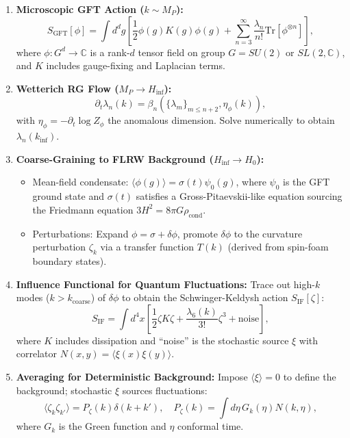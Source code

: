 \documentclass[12pt,a4paper]{article}
\begin{document}
\begin{enumerate}
\item \textbf{Microscopic GFT Action (\(k \sim M_P\)):}
\begin{equation}
S_{\text{GFT}}[\phi] = \int d^d g \left[ \frac{1}{2} \phi(g) K(g) \phi(g) + \sum_{n=3}^\infty \frac{\lambda_n}{n!} \text{Tr}[\phi^{\otimes n}] \right],
\end{equation}
where \(\phi: G^d \to \mathbb{C}\) is a rank-\(d\) tensor field on group \(G = SU(2)\) or \(SL(2, \mathbb{C})\), and \(K\) includes gauge-fixing and Laplacian terms.

\item \textbf{Wetterich RG Flow (\(M_P \to H_{\text{inf}}\)):}
\begin{equation}
\partial_t \lambda_n(k) = \beta_n(\{\lambda_m\}_{m \leq n+2}, \eta_\phi(k)),
\end{equation}
with \(\eta_\phi = -\partial_t \log Z_\phi\) the anomalous dimension. Solve numerically to obtain \(\lambda_n(k_{\text{inf}})\).

\item \textbf{Coarse-Graining to FLRW Background (\(H_{\text{inf}} \to H_0\)):}
\begin{itemize}
\item Mean-field condensate: \(\langle \phi(g) \rangle = \sigma(t) \psi_0(g)\), where \(\psi_0\) is the GFT ground state and \(\sigma(t)\) satisfies a Gross-Pitaevskii-like equation sourcing the Friedmann equation \(3H^2 = 8\pi G \rho_{\text{cond}}\).
\item Perturbations: Expand \(\phi = \sigma + \delta\phi\), promote \(\delta\phi\) to the curvature perturbation \(\zeta_k\) via a transfer function \(T(k)\) (derived from spin-foam boundary states).
\end{itemize}

\item \textbf{Influence Functional for Quantum Fluctuations:} Trace out high-\(k\) modes (\(k > k_{\text{coarse}}\)) of \(\delta\phi\) to obtain the Schwinger-Keldysh action \(S_{\text{IF}}[\zeta]\):
\begin{equation}
S_{\text{IF}} = \int d^4 x \left[ \frac{1}{2} \zeta K \zeta + \frac{\lambda_6(k)}{3!} \zeta^3 + \text{noise} \right],
\end{equation}
where \(K\) includes dissipation and ``noise'' is the stochastic source \(\xi\) with correlator \(N(x, y) = \langle \xi(x) \xi(y) \rangle\).

\item \textbf{Averaging for Deterministic Background:} Impose \(\langle \xi \rangle = 0\) to define the background; stochastic \(\xi\) sources fluctuations:
\begin{equation}
\langle \zeta_k \zeta_{k'} \rangle = P_\zeta(k) \delta(k + k'), \quad P_\zeta(k) = \int d\eta \, G_k(\eta) N(k, \eta),
\end{equation}
where \(G_k\) is the Green function and \(\eta\) conformal time.


\end{enumerate}
\end{document}
